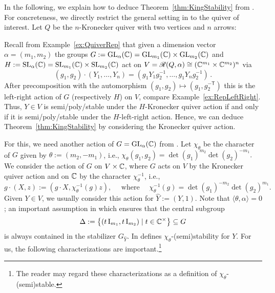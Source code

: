 In the following, we explain how to deduce Theorem~\ref{thm:KingStability} from \cite{King}. For concreteness, we directly restrict the general setting in \cite{King} to the quiver of interest.
Let $Q$ be the $n$-Kronecker quiver with two vertices and $n$ arrows:
\begin{center}
\end{center}
Recall from Example~\ref{ex:QuiverRep} that given a dimension vector $\alpha = (m_1,m_2)$ the groups $G := \operatorname{GL}_\alpha(\mathbb C) = \operatorname{GL}_{m_1}(\mathbb C) \times \operatorname{GL}_{m_2}(\mathbb C)$ and $H := \operatorname{SL}_\alpha(\mathbb C) = \operatorname{SL}_{m_1}(\mathbb C) \times \operatorname{SL}_{m_2}(\mathbb C)$ act on $V = \mathscr{R}(Q,\alpha) \cong (\mathbb C^{m_1} \times \mathbb C^{m_2})^n$ via
	\[ (g_1,g_2) \cdot (Y_1,\ldots,Y_n) = (g_1 Y_1 g_2^{-1}, \ldots, g_1 Y_n g_2^{-1}) \, . \]
After precomposition with the automorphism $(g_1,g_2) \mapsto (g_1, g_2^{-\mathsf{T}})$ this is the left-right action of $G$ (respectively $H$) on $V$, compare Example~\ref{ex:RepLeftRight}. Thus, $Y \in V$ is semi/poly/stable under the $H$-Kronecker quiver action if and only if it is semi/poly/stable under the $H$-left-right action. Hence, we can deduce Theorem~\ref{thm:KingStability} by considering the Kronecker quiver action.

For this, we need another action of $G = \operatorname{GL}_\alpha(\mathbb C)$ from \cite{King}. Let $\chi_\theta$ be the character of $G$ given by $\theta := (m_2, -m_1)$, i.e.,
	$ \chi_{\theta}(g_1,g_2) = \det(g_1)^{m_2} \det(g_2)^{-m_1} .$
We consider the action of $G$ on $V \times \mathbb C$, where $G$ acts on $V$ by the Kronecker quiver action and on $\mathbb C$ by the character $\chi_\theta^{-1}$, i.e.,
\begin{equation}\label{eq:KingChiThetaAction}
	g \cdot (X,z) := (g \cdot X, \chi_{\theta}^{-1}(g)z), \quad\text{ where } \quad
	\chi_{\theta}^{-1}(g) = \det(g_1)^{-m_2} \det(g_2)^{m_1} .
\end{equation}
Given $Y \in V$, we usually consider this action for $\hat{Y} := (Y,1)$.
Note that $\langle \theta, \alpha \rangle = 0$; an important assumption in \cite{King} which ensures that the central subgroup
	\[ \Delta := \big\{ (t \operatorname{I}_{m_1}, t \operatorname{I}_{m_2}) \mid t \in \mathbb C^\times \big\} \subseteq G \]
is always contained in the stabilizer $G_{\hat{Y}}$. In \cite[Definition~2.1]{King} defines $\chi_{\theta}$-(semi)stability for $Y$. For us, the following characterizations are important.\footnote{The reader may regard these characterizations as a definition of $\chi_{\theta}$-(semi)stable.}

